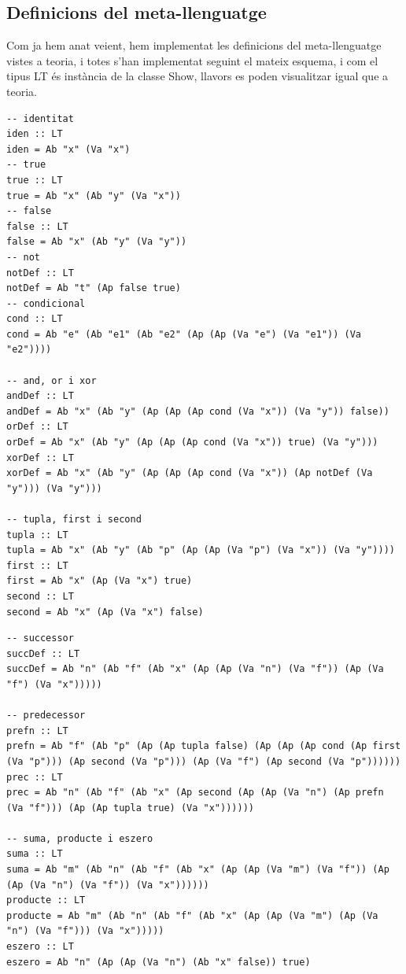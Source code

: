 \documentclass[10pt,a4paper]{article}
\begin{document}
\clearpage

\subsection{Definicions del meta-llenguatge}

Com ja hem anat veient, hem implementat les definicions del meta-llenguatge vistes a teoria, i totes s'han implementat seguint el mateix esquema, i com el tipus LT és instància de la classe Show, llavors es poden visualitzar igual que a teoria.

\lstset{language=Haskell, breaklines=true, basicstyle=\footnotesize}
\begin{lstlisting}[frame=mystyle]
-- identitat
iden :: LT
iden = Ab "x" (Va "x")
-- true
true :: LT
true = Ab "x" (Ab "y" (Va "x"))
-- false
false :: LT
false = Ab "x" (Ab "y" (Va "y"))
-- not
notDef :: LT
notDef = Ab "t" (Ap false true)
-- condicional
cond :: LT
cond = Ab "e" (Ab "e1" (Ab "e2" (Ap (Ap (Va "e") (Va "e1")) (Va "e2"))))

-- and, or i xor
andDef :: LT
andDef = Ab "x" (Ab "y" (Ap (Ap (Ap cond (Va "x")) (Va "y")) false))
orDef :: LT
orDef = Ab "x" (Ab "y" (Ap (Ap (Ap cond (Va "x")) true) (Va "y")))
xorDef :: LT
xorDef = Ab "x" (Ab "y" (Ap (Ap (Ap cond (Va "x")) (Ap notDef (Va "y"))) (Va "y")))

-- tupla, first i second
tupla :: LT
tupla = Ab "x" (Ab "y" (Ab "p" (Ap (Ap (Va "p") (Va "x")) (Va "y"))))
first :: LT
first = Ab "x" (Ap (Va "x") true)
second :: LT
second = Ab "x" (Ap (Va "x") false)
\end{lstlisting}

\lstset{language=Haskell, breaklines=true, basicstyle=\footnotesize}
\begin{lstlisting}[frame=mystyle]
-- successor
succDef :: LT
succDef = Ab "n" (Ab "f" (Ab "x" (Ap (Ap (Va "n") (Va "f")) (Ap (Va "f") (Va "x")))))

-- predecessor
prefn :: LT
prefn = Ab "f" (Ab "p" (Ap (Ap tupla false) (Ap (Ap (Ap cond (Ap first (Va "p"))) (Ap second (Va "p"))) (Ap (Va "f") (Ap second (Va "p"))))))
prec :: LT
prec = Ab "n" (Ab "f" (Ab "x" (Ap second (Ap (Ap (Va "n") (Ap prefn (Va "f"))) (Ap (Ap tupla true) (Va "x"))))))

-- suma, producte i eszero
suma :: LT
suma = Ab "m" (Ab "n" (Ab "f" (Ab "x" (Ap (Ap (Va "m") (Va "f")) (Ap (Ap (Va "n") (Va "f")) (Va "x"))))))
producte :: LT
producte = Ab "m" (Ab "n" (Ab "f" (Ab "x" (Ap (Ap (Va "m") (Ap (Va "n") (Va "f"))) (Va "x")))))
eszero :: LT
eszero = Ab "n" (Ap (Ap (Va "n") (Ab "x" false)) true)
\end{lstlisting}
\end{document}
